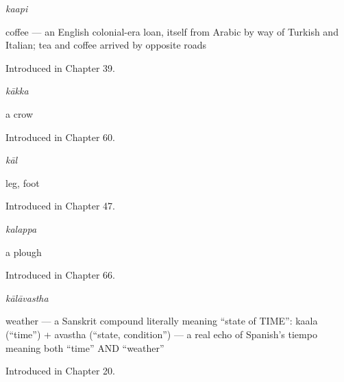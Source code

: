 \noindent\begin{minipage}[t]{\linewidth}
\raggedright
\textbf{}\enspace\emph{kaapi}\par
\small coffee — an English colonial-era loan, itself from Arabic by way of Turkish and Italian; tea and coffee arrived by opposite roads\par
\footnotesize Introduced in Chapter 39.
\end{minipage}\par\medskip

\noindent\begin{minipage}[t]{\linewidth}
\raggedright
\textbf{}\enspace\emph{kākka}\par
\small a crow\par
\footnotesize Introduced in Chapter 60.
\end{minipage}\par\medskip

\noindent\begin{minipage}[t]{\linewidth}
\raggedright
\textbf{}\enspace\emph{kāl}\par
\small leg, foot\par
\footnotesize Introduced in Chapter 47.
\end{minipage}\par\medskip

\noindent\begin{minipage}[t]{\linewidth}
\raggedright
\textbf{}\enspace\emph{kalappa}\par
\small a plough\par
\footnotesize Introduced in Chapter 66.
\end{minipage}\par\medskip

\noindent\begin{minipage}[t]{\linewidth}
\raggedright
\textbf{}\enspace\emph{kālāvastha}\par
\small weather — a Sanskrit compound literally meaning \textquotedblleft{}state of TIME\textquotedblright{}: kaala (\textquotedblleft{}time\textquotedblright{}) + avastha (\textquotedblleft{}state, condition\textquotedblright{}) — a real echo of Spanish's tiempo meaning both \textquotedblleft{}time\textquotedblright{} AND \textquotedblleft{}weather\textquotedblright{}\par
\footnotesize Introduced in Chapter 20.
\end{minipage}\par\medskip

